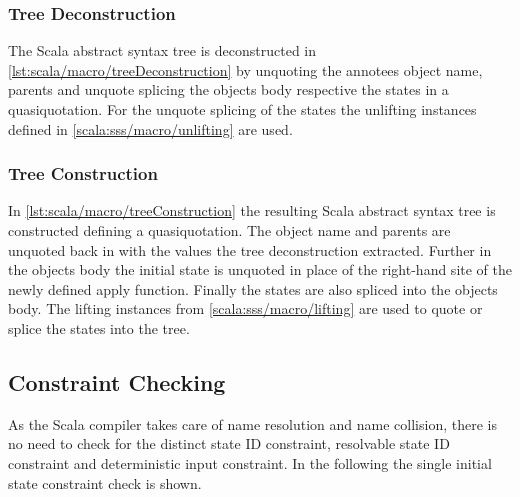 

\subsubsection{Tree Deconstruction}

The Scala abstract syntax tree is deconstructed in \autoref{lst:scala/macro/treeDeconstruction} by unquoting the annotees object name, parents and unquote splicing the objects body respective the states in a quasiquotation.
For the unquote splicing of the states the unlifting instances defined in \autoref{scala:sss/macro/unlifting} are used.



\subsubsection{Tree Construction}

In \autoref{lst:scala/macro/treeConstruction} the resulting Scala abstract syntax tree is constructed defining a quasiquotation.
The object name and parents are unquoted back in with the values the tree deconstruction extracted.
Further in the objects body the initial state is unquoted in place of the right-hand site of the newly defined apply function.
Finally the states are also spliced into the objects body.
The lifting instances from \autoref{scala:sss/macro/lifting} are used to quote or splice the states into the tree.



\subsection{Constraint Checking}

As the Scala compiler takes care of name resolution and name collision, there is no need to check for the distinct state ID constraint, resolvable state ID constraint and deterministic input constraint.
In the following the single initial state constraint check is shown.


